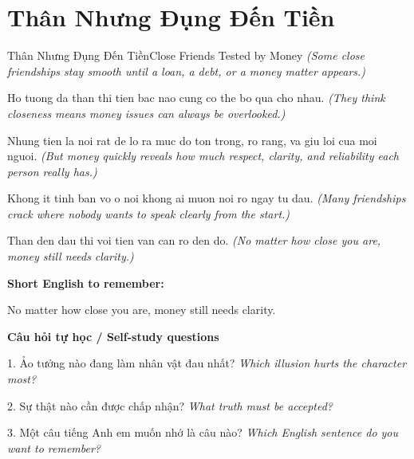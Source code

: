 \section{Thân Nhưng Đụng Đến Tiền}
\begin{truyen}{Thân Nhưng Đụng Đến Tiền}{Close Friends Tested by Money}
\textit{(Some close friendships stay smooth until a loan, a debt, or a money matter appears.)}

Ho tuong da than thi tien bac nao cung co the bo qua cho nhau.
\textit{(They think closeness means money issues can always be overlooked.)}

Nhung tien la noi rat de lo ra muc do ton trong, ro rang, va giu loi cua moi nguoi.
\textit{(But money quickly reveals how much respect, clarity, and reliability each person really has.)}

Khong it tinh ban vo o noi khong ai muon noi ro ngay tu dau.
\textit{(Many friendships crack where nobody wants to speak clearly from the start.)}

\end{truyen}

\begin{baihoc}
Than den dau thi voi tien van can ro den do.
\textit{(No matter how close you are, money still needs clarity.)}
\end{baihoc}

\begin{ghinhoanh}
\textbf{Short English to remember:}

No matter how close you are, money still needs clarity.

\end{ghinhoanh}

\begin{tuhocnhanh}
\textbf{Câu hỏi tự học / Self-study questions}

1. Ảo tưởng nào đang làm nhân vật đau nhất? \textit{Which illusion hurts the character most?}

2. Sự thật nào cần được chấp nhận? \textit{What truth must be accepted?}

3. Một câu tiếng Anh em muốn nhớ là câu nào? \textit{Which English sentence do you want to remember?}
\end{tuhocnhanh}
\ngancach

